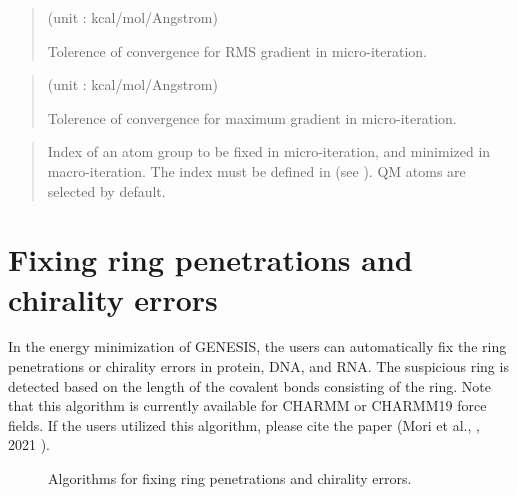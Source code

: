 \documentclass[a4paper,11pt,oneside,english]{sphinxmanual}
\begin{document}
 
\begin{quote}

 (unit : kcal/mol/Angstrom)

Tolerence of convergence for RMS gradient in micro-iteration.
\end{quote}

 
\begin{quote}

 (unit : kcal/mol/Angstrom)

Tolerence of convergence for maximum gradient in micro-iteration.
\end{quote}

 
\begin{quote}

Index of an atom group to be fixed in micro-iteration, and
minimized in macro-iteration.
The index must be defined in \sphinxstylestrong{{[}SELECTION{]}} (see {\hyperref[\detokenize{11_Selection:selection}]{}}).
QM atoms are selected by default.
\end{quote}


\section{Fixing ring penetrations and chirality errors}
\label{\detokenize{07_Minimize:fixing-ring-penetrations-and-chirality-errors}}
In the energy minimization of GENESIS, the users can automatically fix the ring penetrations or chirality errors in protein, DNA, and RNA.
The suspicious ring is detected based on the length of the covalent bonds consisting of the ring.
Note that this algorithm is currently available for CHARMM or CHARMM19 force fields.
If the users utilized this algorithm, please cite the paper (Mori et al., , 2021 ).

\begin{figure}[htbp]
\centering
\capstart

\noindent{}
\caption{Algorithms for fixing ring penetrations and chirality errors.}\label{\detokenize{07_Minimize:id2}}\end{figure}
\end{document}
